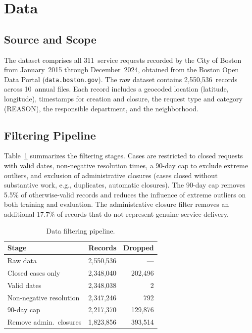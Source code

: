 \documentclass[sigconf,nonacm]{acmart}
\begin{document}
\section{Data}
\label{sec:data}

\subsection{Source and Scope}

The dataset comprises all 311~service requests recorded by the
City of Boston from January~2015 through December~2024, obtained
from the Boston Open Data Portal (\texttt{data.boston.gov}). The
raw dataset contains 2,550,536~records across 10~annual files.
Each record includes a geocoded location (latitude, longitude),
timestamps for creation and closure, the request type and
category (REASON), the responsible department, and the
neighborhood.

\subsection{Filtering Pipeline}

Table~\ref{tab:filtering} summarizes the filtering stages. Cases
are restricted to closed requests with valid dates, non-negative
resolution times, a 90-day cap to exclude extreme outliers, and
exclusion of administrative closures (cases closed without
substantive work, e.g., duplicates, automatic closures). The
90-day cap removes 5.5\% of otherwise-valid records and reduces
the influence of extreme outliers on both training and evaluation.
The administrative closure filter removes an additional 17.7\% of
records that do not represent genuine service delivery.

\begin{table}[t]
\caption{Data filtering pipeline.}
\label{tab:filtering}
\centering
\small
\begin{tabular}{lrr}
\toprule
\textbf{Stage} & \textbf{Records} & \textbf{Dropped} \\
\midrule
Raw data                & 2,550,536 & ---     \\
Closed cases only       & 2,348,040 & 202,496 \\
Valid dates             & 2,348,038 & 2       \\
Non-negative resolution & 2,347,246 & 792     \\
90-day cap              & 2,217,370 & 129,876 \\
Remove admin.\ closures & 1,823,856 & 393,514 \\
\bottomrule
\end{tabular}
\end{table}
\end{document}
